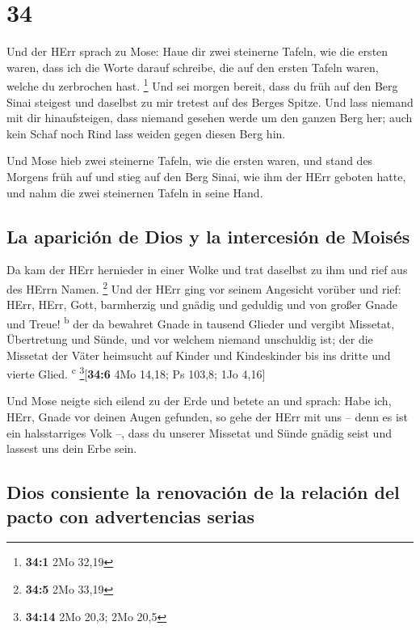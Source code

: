 \hypertarget{section-33}{%
\section{34}\label{section-33}}

 Und der HErr sprach zu Mose: Haue dir zwei steinerne
Tafeln, wie die ersten waren, dass ich die Worte darauf schreibe, die
auf den ersten Tafeln waren, welche du zerbrochen hast. \footnote{\textbf{34:1}
  2Mo 32,19}  Und sei morgen bereit, dass du früh auf den
Berg Sinai steigest und daselbst zu mir tretest auf des Berges Spitze.
 Und lass niemand mit dir hinaufsteigen, dass niemand
gesehen werde um den ganzen Berg her; auch kein Schaf noch Rind lass
weiden gegen diesen Berg hin.

 Und Mose hieb zwei steinerne Tafeln, wie die ersten
waren, und stand des Morgens früh auf und stieg auf den Berg Sinai, wie
ihm der HErr geboten hatte, und nahm die zwei steinernen Tafeln in seine
Hand.

\hypertarget{la-apariciuxf3n-de-dios-y-la-intercesiuxf3n-de-moisuxe9s}{%
\subsection{La aparición de Dios y la intercesión de
Moisés}\label{la-apariciuxf3n-de-dios-y-la-intercesiuxf3n-de-moisuxe9s}}

 Da kam der HErr hernieder in einer Wolke und trat
daselbst zu ihm und rief aus des HErrn Namen. \footnote{\textbf{34:5}
  2Mo 33,19}  Und der HErr ging vor seinem Angesicht
vorüber und rief: HErr, HErr, Gott, barmherzig und gnädig und geduldig
und von großer Gnade und Treue! \textsuperscript{b}  der
da bewahret Gnade in tausend Glieder und vergibt Missetat, Übertretung
und Sünde, und vor welchem niemand unschuldig ist; der die Missetat der
Väter heimsucht auf Kinder und Kindeskinder bis ins dritte und vierte
Glied. \textsuperscript{c} \footnote{\textbf{34:14} 2Mo 20,3; 2Mo 20,5}{[}\textbf{34:6}
4Mo 14,18; Ps 103,8; 1Jo 4,16{]}

 Und Mose neigte sich eilend zu der Erde und betete an
 und sprach: Habe ich, HErr, Gnade vor deinen Augen
gefunden, so gehe der HErr mit uns -- denn es ist ein halsstarriges Volk
--, dass du unserer Missetat und Sünde gnädig seist und lassest uns dein
Erbe sein.

\hypertarget{dios-consiente-la-renovaciuxf3n-de-la-relaciuxf3n-del-pacto-con-advertencias-serias}{%
\subsection{Dios consiente la renovación de la relación del pacto con
advertencias
serias}\label{dios-consiente-la-renovaciuxf3n-de-la-relaciuxf3n-del-pacto-con-advertencias-serias}}

